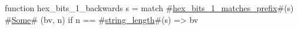 function hex_bits_1_backwards s =
  match #\hyperref[sailRISCVzhexzybitszy1zymatcheszyprefix]{hex\_bits\_1\_matches\_prefix}#(s) {
      #\hyperref[sailRISCVzSome]{Some}# (bv, n) if n == #\hyperref[sailRISCVzstringzylength]{string\_length}#(s) => bv
  }
